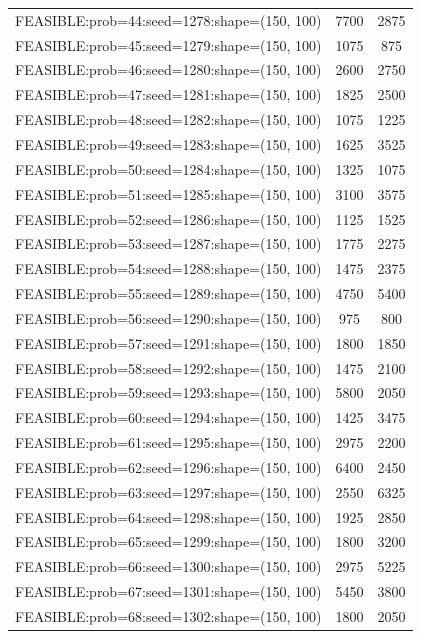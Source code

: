 \begin{longtable}{lcc}
FEASIBLE:prob=44:seed=1278:shape=(150, 100)  &     7700 &  2875 \\
FEASIBLE:prob=45:seed=1279:shape=(150, 100)  &     1075 &   875 \\
FEASIBLE:prob=46:seed=1280:shape=(150, 100)  &     2600 &  2750 \\
FEASIBLE:prob=47:seed=1281:shape=(150, 100)  &     1825 &  2500 \\
FEASIBLE:prob=48:seed=1282:shape=(150, 100)  &     1075 &  1225 \\
FEASIBLE:prob=49:seed=1283:shape=(150, 100)  &     1625 &  3525 \\
FEASIBLE:prob=50:seed=1284:shape=(150, 100)  &     1325 &  1075 \\
FEASIBLE:prob=51:seed=1285:shape=(150, 100)  &     3100 &  3575 \\
FEASIBLE:prob=52:seed=1286:shape=(150, 100)  &     1125 &  1525 \\
FEASIBLE:prob=53:seed=1287:shape=(150, 100)  &     1775 &  2275 \\
FEASIBLE:prob=54:seed=1288:shape=(150, 100)  &     1475 &  2375 \\
FEASIBLE:prob=55:seed=1289:shape=(150, 100)  &     4750 &  5400 \\
FEASIBLE:prob=56:seed=1290:shape=(150, 100)  &      975 &   800 \\
FEASIBLE:prob=57:seed=1291:shape=(150, 100)  &     1800 &  1850 \\
FEASIBLE:prob=58:seed=1292:shape=(150, 100)  &     1475 &  2100 \\
FEASIBLE:prob=59:seed=1293:shape=(150, 100)  &     5800 &  2050 \\
FEASIBLE:prob=60:seed=1294:shape=(150, 100)  &     1425 &  3475 \\
FEASIBLE:prob=61:seed=1295:shape=(150, 100)  &     2975 &  2200 \\
FEASIBLE:prob=62:seed=1296:shape=(150, 100)  &     6400 &  2450 \\
FEASIBLE:prob=63:seed=1297:shape=(150, 100)  &     2550 &  6325 \\
FEASIBLE:prob=64:seed=1298:shape=(150, 100)  &     1925 &  2850 \\
FEASIBLE:prob=65:seed=1299:shape=(150, 100)  &     1800 &  3200 \\
FEASIBLE:prob=66:seed=1300:shape=(150, 100)  &     2975 &  5225 \\
FEASIBLE:prob=67:seed=1301:shape=(150, 100)  &     5450 &  3800 \\
FEASIBLE:prob=68:seed=1302:shape=(150, 100)  &     1800 &  2050 \\

\end{longtable}
